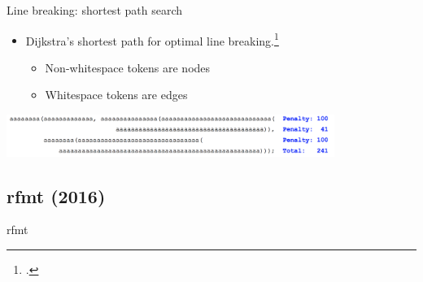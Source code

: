\documentclass[xcolor=dvipsnames]{beamer}
\theoremstyle{definition}
\begin{document}
\begin{frame}{Line breaking: shortest path search}
  \begin{itemize}
    \item Dijkstra's shortest path for optimal line breaking.\footcite{jasper_clang-format_2014}
      \begin{itemize}
        \item Non-whitespace tokens are nodes
        \item Whitespace tokens are edges
      \end{itemize}
  \end{itemize}
  \begin{center}
    \includegraphics[width=0.8\textwidth]{img/dijkstra.png}
  \end{center}
\end{frame}

\subsection{rfmt (2016)}
\begin{frame}{}
  \begin{center}
    \Huge rfmt
  \end{center}
\end{frame}
\end{document}

